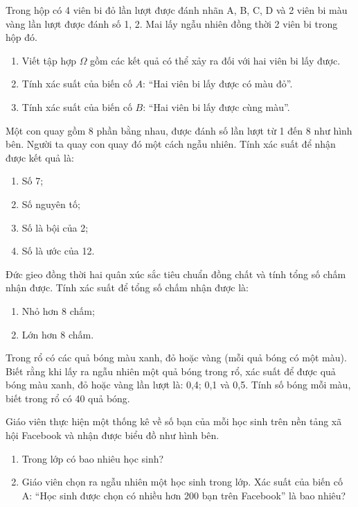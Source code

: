 \documentclass[%
    fontsize=12pt,%
    chapterprefix=false,%
    open=right,%
    twoside=false,%
    numbers=noenddot,%
    headings=optiontohead,%
    final,%
    DIV=15,%
    parskip=half %
]{scrbook}
\begin{document}
\begin{tuluan}

\item Trong hộp có 4 viên bi đỏ lần lượt được đánh nhãn A, B, C, D và 2 viên bi màu vàng lần lượt được đánh số 1, 2. Mai lấy ngẫu nhiên đồng thời 2 viên bi trong hộp đó.
\begin{enumerate}[label=\alph*)]
  \item[a)] Viết tập hợp $ \Omega $ gồm các kết quả có thể xảy ra đối với hai viên bi lấy được.
  \item[b)] Tính xác suất của biến cố $ A $: ``Hai viên bi lấy được có màu đỏ''.
  \item[c)] Tính xác suất của biến cố $ B $: ``Hai viên bi lấy được cùng màu''.
\end{enumerate}

\item Một con quay gồm 8 phần bằng nhau, được đánh số lần lượt từ 1 đến 8 như hình bên. Người ta quay con quay đó một cách ngẫu nhiên. Tính xác suất để nhận được kết quả là:
\begin{enumerate}[label=\alph*)]
  \item[a)] Số 7;
  \item[b)] Số nguyên tố;
  \item[c)] Số là bội của 2;
  \item[d)] Số là ước của 12.
\end{enumerate}

\item Đức gieo đồng thời hai quân xúc sắc tiêu chuẩn đồng chất và tính tổng số chấm nhận được. Tính xác suất để tổng số chấm nhận được là:
\begin{enumerate}[label=\alph*)]
  \item[a)] Nhỏ hơn 8 chấm;
  \item[b)] Lớn hơn 8 chấm.
\end{enumerate}

\item Trong rổ có các quả bóng màu xanh, đỏ hoặc vàng (mỗi quả bóng có một màu). Biết rằng khi lấy ra ngẫu nhiên một quả bóng trong rổ, xác suất để được quả bóng màu xanh, đỏ hoặc vàng lần lượt là: 0,4; 0,1 và 0,5. Tính số bóng mỗi màu, biết trong rổ có 40 quả bóng.

\item Giáo viên thực hiện một thống kê về số bạn của mỗi học sinh trên nền tảng xã hội Facebook và nhận được biểu đồ như hình bên.
\begin{enumerate}[label=\alph*)]
  \item[a)] Trong lớp có bao nhiêu học sinh?
  \item[b)] Giáo viên chọn ra ngẫu nhiên một học sinh trong lớp. Xác suất của biến cố A: ``Học sinh được chọn có nhiều hơn 200 bạn trên Facebook'' là bao nhiêu?
\end{enumerate}


\end{tuluan}
\end{document}
